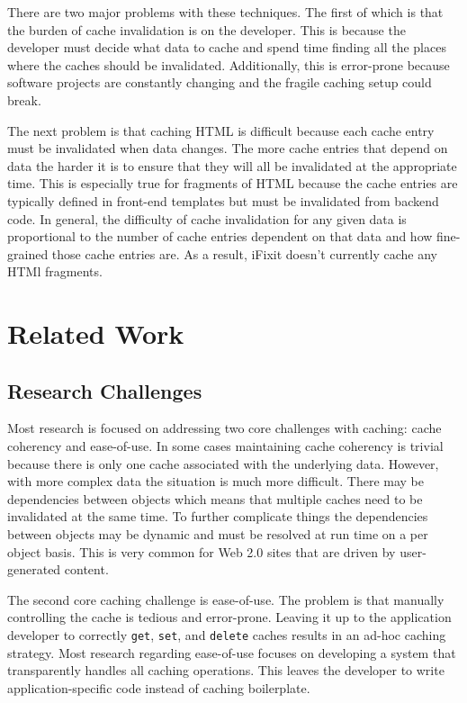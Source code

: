 \documentclass[12pt]{ucthesis}
\begin{document}
There are two major problems with these techniques.
The first of which is that the burden of cache invalidation is on the developer.
This is because the developer must decide what data to cache and spend time finding all the places where the caches should be invalidated.
Additionally, this is error-prone because software projects are constantly changing and the fragile caching setup could break.

The next problem is that caching HTML is difficult because each cache entry must be invalidated when data changes.
The more cache entries that depend on data the harder it is to ensure that they will all be invalidated at the appropriate time.
This is especially true for fragments of HTML because the cache entries are typically defined in front-end templates but must be invalidated from backend code.
In general, the difficulty of cache invalidation for any given data is proportional to the number of cache entries dependent on that data and how fine-grained those cache entries are.
As a result, iFixit doesn't currently cache any HTMl fragments.



\section{Related Work}
\subsection{Research Challenges}
Most research is focused on addressing two core challenges with caching: cache coherency and ease-of-use.
In some cases maintaining cache coherency is trivial because there is only one cache associated with the underlying data.
However, with more complex data the situation is much more difficult.
There may be dependencies between objects which means that multiple caches need to be invalidated at the same time.
To further complicate things the dependencies between objects may be dynamic and must be resolved at run time on a per object basis.
This is very common for Web 2.0 sites that are driven by user-generated content.

The second core caching challenge is ease-of-use.
The problem is that manually controlling the cache is tedious and error-prone.
Leaving it up to the application developer to correctly {\tt get}, {\tt set}, and {\tt delete} caches results in an ad-hoc caching strategy.
Most research regarding ease-of-use focuses on developing a system that transparently handles all caching operations.
This leaves the developer to write application-specific code instead of caching boilerplate.
\end{document}
